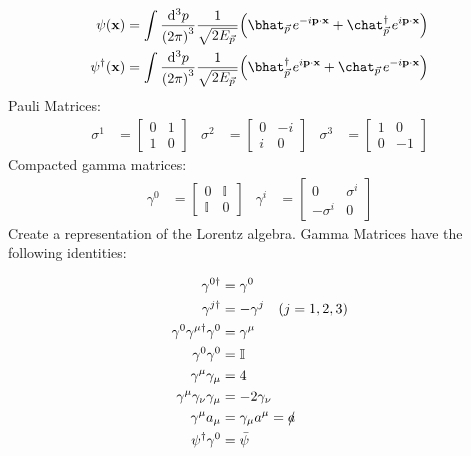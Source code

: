 \begin{align}
	\psi(\vb{x})&=\int\frac{\d^3p}{\qty(2\pi)^3}
	\oo{\sqrt{2E_{\ppp}}}
	\qty(\bhat_{\ppp}e^{-i\vb{p} \cdot \vb{x}} + \chat_{\ppp}^{\dagger}e^{i\vb{p} \cdot \vb{x}} )
	\\
	\psi^{\dagger}(\vb{x})&=\int\frac{\d^3p}{\qty(2\pi)^3}
	\oo{\sqrt{2E_{\ppp}}}
	\qty(\bhat_{\ppp}^{\dagger}e^{i\vb{p} \cdot \vb{x}} + \chat_{\ppp}e^{-i\vb{p} \cdot \vb{x}} )
\end{align}
Pauli Matrices:
\begin{align*}
	\sigma^1&=\begin{bmatrix} 0 &  1 \\ 1 &  0 \end{bmatrix}&
	\sigma^2&=\begin{bmatrix} 0 & -i \\ i &  0 \end{bmatrix}&
	\sigma^3&=\begin{bmatrix} 1 &  0 \\ 0 & -1 \end{bmatrix}
\end{align*}
Compacted gamma matrices:
\begin{align*}
	\gamma^0&=\begin{bmatrix}0&\mathbb{I}\\\mathbb{I}&0\end{bmatrix}&
	\gamma^i&=\begin{bmatrix}0&\sigma^i\\-\sigma^i&0\end{bmatrix}
\end{align*}
Create a representation of the Lorentz algebra. 
Gamma Matrices have the following identities:
\\
\begin{minipage}{0.45\textwidth}
	\begin{align*}
		\gamma^{0\dagger}&=\gamma^0
		\\
		\gamma^{j\dagger}&=-\gamma^j\quad\qty(j=1,2,3)
		\\
		\gamma^0\gamma^{\mu\dagger}\gamma^0&=\gamma^\mu
		\\
		\gamma^{0}\gamma^{0}&=\mathbb{I}
		\\
		\gamma^\mu\gamma_\mu&=4
		\\
		\gamma^\mu\gamma_\nu\gamma_\mu&=-2\gamma_\nu
		\\
		\gamma^\mu a_\mu&=\gamma_\mu a^\mu=\slashed{a}
		\\
		\psi^\dagger\gamma^0&=\bar{\psi}
	\end{align*}
\end{minipage}
